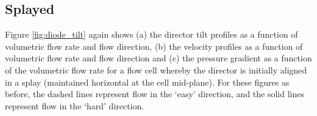 \subsection{Splayed}
Figure \ref{fig:diode_tilt} again shows (a) the director tilt profiles as a function of volumetric flow rate and flow direction, (b) the velocity profiles as a function of volumetric flow rate and flow direction and (c) the pressure gradient as a function of the volumetric flow rate for a flow cell whereby the director is initially aligned in a splay (maintained horizontal at the cell mid-plane). For these figures as before, the dashed lines represent flow in the `easy' direction, and the solid lines represent flow in the `hard' direction.

\begin{figure}
\begin{center}

\end{center}
\end{figure}
